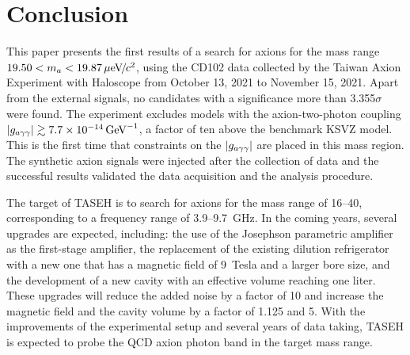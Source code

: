 \newpage
\section{Conclusion} \label{sec:conclusion}
This paper presents the first results of a search for axions for the mass 
range $19.50 < m_a < 19.87 \,\mu\text{e\hspace{-.08em}V\hspace{-0.16em}/\hspace{-0.08em}}c^2$, using the CD102 data collected by the 
Taiwan Axion Experiment with Haloscope from October 13, 2021 to November 15, 
2021. 
Apart from the external signals, no candidates with a significance more than
3.355$\sigma$ were found. The experiment excludes models with the 
axion-two-photon coupling $\left|g_{a\gamma\gamma}\right|\gtrsim 7.7\times 10^{-14}\,\text{Ge\hspace{-.08em}V}^{-1}$, a factor of ten 
above the benchmark KSVZ model. This is the first time that 
constraints on the $\left|g_{a\gamma\gamma}\right|$ are placed in this mass region. The synthetic 
axion signals were injected after the collection of data and the 
successful results validated the data acquisition and the analysis procedure. 

The target of TASEH is to search for axions for the mass range of 
16--40\muevcc, corresponding to a frequency range of 3.9--9.7~GHz. 
In the coming years, several upgrades are expected, including: the use of 
the Josephson parametric amplifier as the first-stage amplifier, the 
replacement of the existing dilution refrigerator with a new one that has 
a magnetic field of 9~Tesla and a larger bore size, and the development of 
a new cavity with an effective volume reaching one liter. These upgrades 
will reduce the added noise by a factor of 10 and increase the magnetic 
field and the cavity volume by a factor of 1.125 and 5. With the 
improvements of the experimental setup and several years of data taking, 
TASEH is expected to probe the QCD axion photon band in the target mass range.


